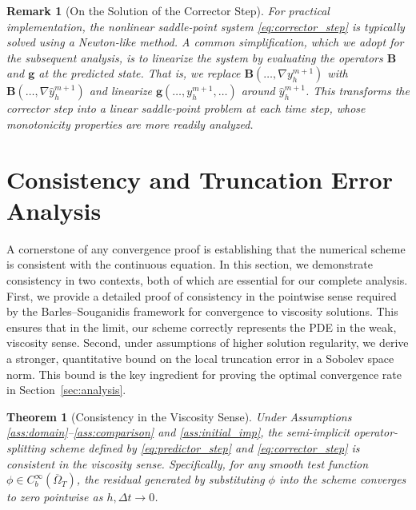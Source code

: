 \documentclass[pdflatex,sn-mathphys-num]{sn-jnl}%
\theoremstyle{thmstyleone}%
\newtheorem{thm}{Theorem}[section]
\newtheorem{rmk}{Remark}[section]
\numberwithin{equation}{section}
\begin{document}
\begin{rmk}[On the Solution of the Corrector Step]
\label{rmk:linearization}
For practical implementation, the nonlinear saddle-point system \eqref{eq:corrector_step} is typically solved using a Newton-like method. A common simplification, which we adopt for the subsequent analysis, is to linearize the system by evaluating the operators $\bm{B}$ and $\bm{g}$ at the predicted state. That is, we replace $\bm{B}(\dots, \nabla y_h^{m+1})$ with $\bm{B}(\dots, \nabla \hat{y}_h^{m+1})$ and linearize $\bm{g}(\dots, y_h^{m+1}, \dots)$ around $\hat{y}_h^{m+1}$. This transforms the corrector step into a linear saddle-point problem at each time step, whose monotonicity properties are more readily analyzed.
\end{rmk}


\section{Consistency and Truncation Error Analysis}
\label{sec:consistency}

A cornerstone of any convergence proof is establishing that the numerical scheme is consistent with the continuous equation. In this section, we demonstrate consistency in two contexts, both of which are essential for our complete analysis. First, we provide a detailed proof of consistency in the pointwise sense required by the Barles--Souganidis framework for convergence to viscosity solutions. This ensures that in the limit, our scheme correctly represents the PDE in the weak, viscosity sense. Second, under assumptions of higher solution regularity, we derive a stronger, quantitative bound on the local truncation error in a Sobolev space norm. This bound is the key ingredient for proving the optimal convergence rate in Section~\ref{sec:analysis}.

\begin{thm}[Consistency in the Viscosity Sense]
\label{thm:consistency_viscosity}
Under Assumptions \ref{ass:domain}--\ref{ass:comparison} and \ref{ass:initial_imp}, the semi-implicit operator-splitting scheme defined by \eqref{eq:predictor_step} and \eqref{eq:corrector_step} is consistent in the viscosity sense. Specifically, for any smooth test function $\phi \in C_b^\infty(\overline{\Omega}_T)$, the residual generated by substituting $\phi$ into the scheme converges to zero pointwise as $h, \Delta t \to 0$.
\end{thm}
\end{document}
